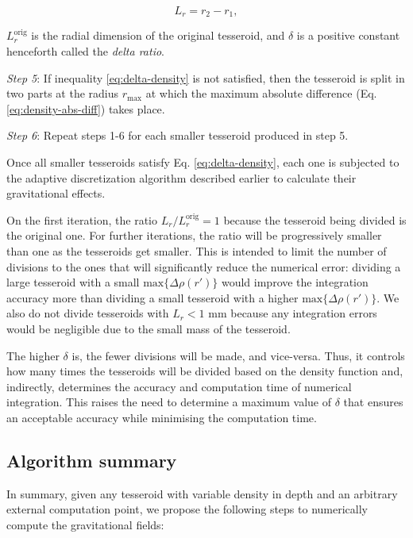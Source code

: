 \documentclass[extra, referee]{gji}
\begin{document}
\begin{equation}
    L_r = r_2 - r_1,
\end{equation}

\noindent $L_r^\text{orig}$ is the radial dimension of the original tesseroid, and
$\delta$ is a positive constant henceforth called the \textit{delta ratio}.

\textit{Step 5}:
If inequality \ref{eq:delta-density} is not satisfied, then the tesseroid is split in
two parts at the radius $r_\text{max}$ at which the maximum absolute difference (Eq.
\ref{eq:density-abs-diff}) takes place.

\textit{Step 6}:
Repeat steps 1-6 for each smaller tesseroid produced in step 5.

Once all smaller tesseroids satisfy Eq. \ref{eq:delta-density},
each one is subjected to the adaptive
discretization algorithm described earlier to calculate their gravitational effects.

On the first iteration, the ratio $L_r/L_r^\text{orig} = 1$ because the tesseroid being
divided is the original one.
For further iterations, the ratio will be progressively smaller than one as the
tesseroids get smaller.
This is intended to limit the number of divisions to the ones that will
significantly reduce the numerical error:
dividing a large tesseroid with a small $\text{max}\{ \Delta \rho(r') \}$ would
improve the integration accuracy more than dividing a small tesseroid with a
higher $\text{max}\{ \Delta \rho(r') \}$.
We also do not divide tesseroids with $L_r < 1$ mm because any integration errors would
be negligible due to the small mass of the tesseroid.

The higher $\delta$ is, the fewer divisions will be made, and vice-versa.
Thus, it controls how many times the tesseroids will be divided based on the density
function and, indirectly, determines the accuracy and computation time of
numerical integration.
This raises the need to determine a maximum value of $\delta$ that
ensures an acceptable accuracy while minimising the computation time.


\subsection{Algorithm summary}

In summary, given any tesseroid with variable density in depth and an arbitrary
external computation point, we propose the following steps to numerically
compute the gravitational fields:
\end{document}
